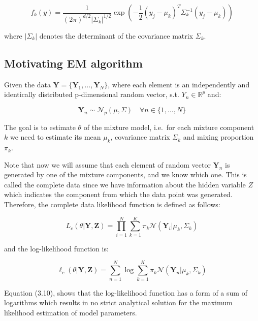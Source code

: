 \begin{equation}
    f_k(y) = \frac{1}{{(2\pi)}^{d/2}|\Sigma_k|^{1/2}} \exp\left(-\frac{1}{2}{(y_j-\mu_k)}^T\Sigma_k^{-1}(y_j-\mu_k)\right)
\end{equation}

where $|\Sigma_k|$ denotes the determinant of the covariance matrix $\Sigma_k$.

\subsection{Motivating EM algorithm}
\cite{Bishop2006}
Given the data $\textbf{Y} = \{\textbf{Y}_1,\ldots,\textbf{Y}_N\}$, where each element is an independently and identically distributed 
p-dimensional random vector, s.t. $Y_n \in \mathbb{R}^p$ and:

\begin{equation}
    \textbf{Y}_n \sim \mathcal{N}_p(\mu, \Sigma) \quad \forall n \in \{1,\ldots,N\} 
\end{equation}

The goal is to estimate $\theta$ of the mixture model, 
i.e.\ for each mixture component $k$ we need to estimate its mean $\mu_k$, covariance matrix $\Sigma_k$ and mixing proportion $\pi_k$. 

Note that now we will assume that each element of random vector $\textbf{Y}_n$ is generated by one of the mixture components, and we know which one. 
This is called the complete data since we have information about the hidden variable $Z$ which indicates the component from which the data point was generated.
Therefore, the complete data likelihood function is defined as follows: 

\begin{equation} \label{eq:likelihood-gaussian}
    L_c(\theta|\textbf{Y},\textbf{Z}) = \prod_{i=1}^{N} \sum_{k=1}^{K} \pi_k \mathcal{N}(\textbf{Y}_i|\mu_k,\Sigma_k)
\end{equation}

and the log-likelihood function is:

\begin{equation}
    \ell_c(\theta|\textbf{Y},\textbf{Z}) = \sum_{n=1}^{N} \log \sum_{k=1}^{K} \pi_k \mathcal{N}(\textbf{Y}_n|\mu_k,\Sigma_k)
\end{equation}

Equation (3.10), shows that the log-likelihood function has a form of a sum of logarithms which results in no strict analytical solution for the maximum likelihood estimation of model parameters.

